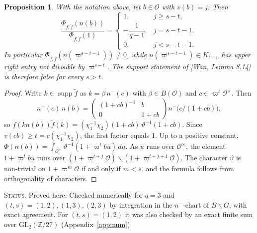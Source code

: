 \documentclass[11pt]{amsart}
\newtheorem{proposition}[theorem]{Proposition}
\theoremstyle{definition}
\theoremstyle{remark}
\newcommand{\Z}{\mathbb{Z}}
\newcommand{\cO}{\mathcal{O}}
\newcommand{\GL}{\mathrm{GL}}
\newcommand{\vp}{\varpi}
\newcommand{\nm}{n^{-}}
\newcommand{\status}[1]{\par\smallskip\noindent\textsc{Status.} #1\par\smallskip}
\begin{document}
\begin{proposition}\label{prop:814}
With the notation above, let $b\in\cO$ with $v(b)=j$. Then
\[
\frac{\Phi_{f,\tilde f}(n(b))}{\Phi_{f,\tilde f}(1)}=\begin{cases}1,& j\ge s-t,\\ -\dfrac{1}{q-1},& j=s-t-1,\\ 0,& j<s-t-1.\end{cases}
\]
In particular $\Phi_{f,\tilde f}(n(\vp^{s-t-1}))\ne0$, while $n(\vp^{s-t-1})\in K_{t+s}$ has upper right entry not divisible by $\vp^{s-t}$. The support statement of [Wan, Lemma 8.14] is therefore false for every $s>t$.
\end{proposition}

\begin{proof}
Write $k\in\operatorname{supp}\tilde f$ as $k=\beta\,\nm(c)$ with $\beta\in B(\cO)$ and $c\in\vp^t\cO^\times$. Then
\[
\nm(c)\,n(b)=\begin{pmatrix}(1+cb)^{-1}&b\\0&1+cb\end{pmatrix}\nm\!\big(c/(1+cb)\big),
\]
so $f(kn(b))\tilde f(k)=(\chi_1^{-1}\chi_2)(1+cb)\,\vartheta^{-1}(1+cb)$. Since $v(cb)\ge t=c(\chi_1^{-1}\chi_2)$, the first factor equals $1$. Up to a positive constant, $\Phi(n(b))=\int_{\cO^\times}\vartheta^{-1}(1+\vp^tbu)\,du$. As $u$ runs over $\cO^\times$, the element $1+\vp^tbu$ runs over $(1+\vp^{t+j}\cO)\smallsetminus(1+\vp^{t+j+1}\cO)$. The character $\vartheta$ is non-trivial on $1+\vp^m\cO$ if and only if $m<s$, and the formula follows from orthogonality of characters.
\end{proof}

\status{Proved here. Checked numerically for $q=3$ and $(t,s)=(1,2),(1,3),(2,3)$ by integration in the $\nm$-chart of $B\backslash G$, with exact agreement. For $(t,s)=(1,2)$ it was also checked by an exact finite sum over $\GL_2(\Z/27)$ (Appendix~\ref{app:num}).}
\end{document}
